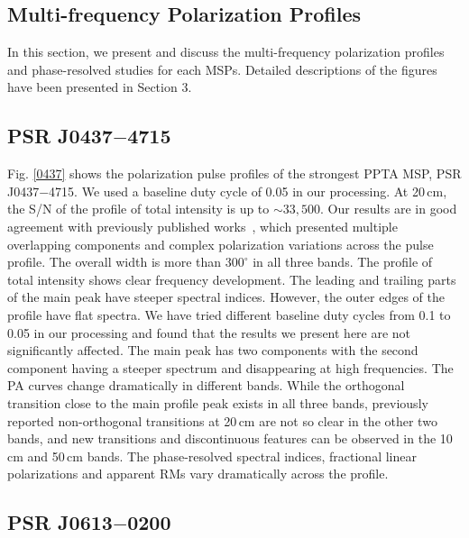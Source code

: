 \documentclass[useAMS,usenatbib]{mn2e}
\begin{document}
\begin{appendix}

\section{Multi-frequency Polarization Profiles}

In this section, we present and discuss the multi-frequency polarization 
profiles and phase-resolved studies for each MSPs. 
%
Detailed descriptions of the figures have been presented in Section $3$.
%

\subsection{PSR J0437$-$4715}

Fig. \ref{0437} shows the polarization pulse profiles of the strongest PPTA 
MSP, PSR J0437$-$4715.
%
We used a baseline duty cycle of 0.05 in our processing.
%
At 20\,cm, the S/N of the profile of total intensity is up to $\sim33,500$. 
Our results are in good agreement with previously published works~\citep{Johnston93,Manchester95_1,Navarro97,Yan11}, 
which presented multiple overlapping components and complex polarization 
variations across the pulse profile. 
%
The overall width is more than $300^{\circ}$ in all three bands.
%
The profile of total intensity shows clear frequency development. The 
leading and trailing parts of the main peak have steeper spectral indices. 
%
However, the outer edges of the profile have flat spectra. We have tried 
different baseline duty cycles from 0.1 to 0.05 in our processing and found 
that the results we present here are not significantly affected.
%
The main peak has two components with the second component having a steeper 
spectrum and disappearing at high frequencies.
%
The PA curves change dramatically in different bands. While the orthogonal 
transition close to the main profile peak exists in all three bands, previously
reported non-orthogonal transitions at 20\,cm are not so clear in the other two bands,
and new transitions and discontinuous features can be observed in the 10\,cm 
and 50\,cm bands.
%
The phase-resolved spectral indices, fractional linear polarizations and apparent 
RMs vary dramatically across the profile.

\subsection{PSR J0613$-$0200}


\end{appendix}
\end{document}
